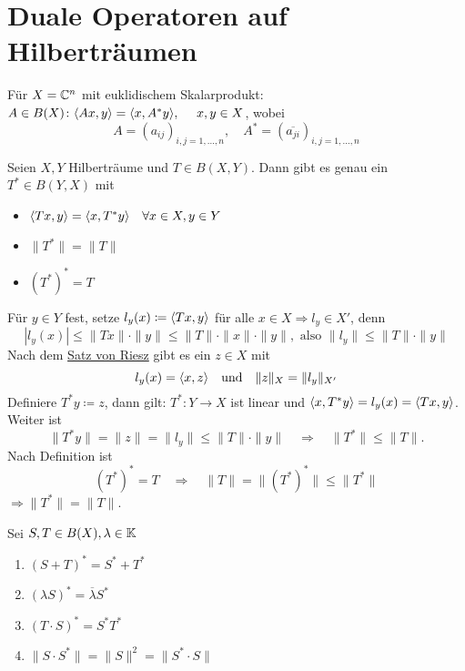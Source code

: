 


\section{Duale Operatoren auf Hilberträumen}



Für $X = \mathbb{C}^{n}$ mit euklidischem Skalarprodukt: \\
$A \in B(X) \colon \< A x , y \> = \< x , A^{*} y \>, \quad x, y \in X$, wobei
\[ A = (a_{ij})_{i, j = 1, \dotsc, n}, \quad A^{*} = (\overline{a_{ji}})_{i, j = 1, \dotsc, n} \]


\begin{satz}
	Seien $X, Y$ Hilberträume und $T \in B(X, Y)$. Dann gibt es genau ein $T^{*} \in B(Y, X)$ mit
	\begin{itemize}
		\item $\langle T x , y \rangle = \langle x , T^{*} y \rangle \quad \forall x \in X, y \in Y$
		\item $\| T^{*} \| = \| T \|$
		\item $\left(T	^{*}\right)^{*} = T$
	\end{itemize}	
\end{satz}

\begin{beweis}
	Für $y \in Y$ fest, setze $l_{y}(x) \coloneqq \langle T x , y \rangle$ für alle $x \in X \Rightarrow l_{y} \in X'$, denn
	\[ | l_{y}(x) | \leq \| T x \| \cdot \| y \| \leq \|T \| \cdot \| x \| \cdot \| y \|, \text{ also } \| l_{y} \| \leq \| T \| \cdot \| y \| \]
	Nach dem \hyperref[satz:17.2-Riesz]{Satz von Riesz} gibt es ein $z \in X$ mit
	\[ l_{y} (x) = \langle x , z \rangle \quad \text{und} \quad \| z \|_{X} = \| l_{y} \|_{X'} \]
	Definiere $T^{*} y \coloneqq z$, dann gilt: $T^{*} \colon Y \rightarrow X$ ist linear und $\langle x , T^{*} y \rangle = l_{y}(x) = \langle T x , y \rangle$. \\
	Weiter ist 
	\[ \| T^{*} y \| = \| z \| = \| l_{y} \| \leq \| T \| \cdot \| y \| \quad \Rightarrow \quad \| T^{*} \| \leq \| T \|. \]
	Nach Definition ist 
	\[ \left( T^{*} \right)^{*} = T \quad \Rightarrow \quad \| T \| = \| \left( T^{*} \right)^{*} \| \leq \| T^{*} \| \]
	$\Rightarrow \| T^{*} \| = \| T \|$. 
\end{beweis}


\begin{bemerkung} \label{bem:19.2}
	Sei $S, T \in B(X), \lambda \in \mathbb{K}$
	\begin{enumerate}[label=\alph*\upshape)]
		\item $\left( S + T \right)^{*} = S^{*} + T^{*}$
		\item $\left( \lambda S \right)^{*} = \overline{\lambda} S^{*}$
		\item $\left( T \cdot S \right)^{*} = S^{*} T^{*}$
		\item $\| S \cdot S^{*} \| = \| S \|^{2} = \| S^{*} \cdot S \|$
	\end{enumerate}
\end{bemerkung}

